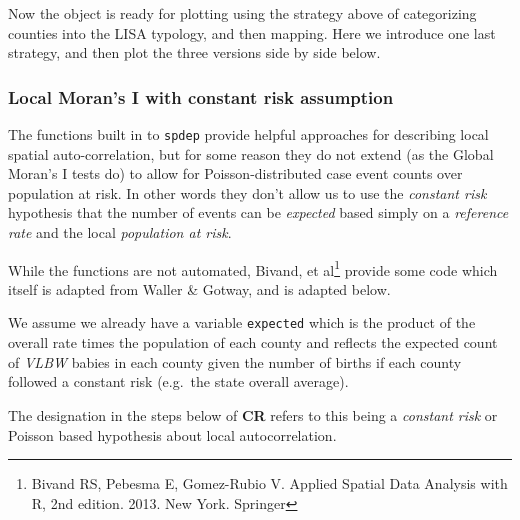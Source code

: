 \documentclass[
]{book}
\newenvironment{Shaded}{\begin{snugshade}}{\end{snugshade}}
\newcommand{\CommentTok}[1]{\textcolor[rgb]{0.56,0.35,0.01}{\textit{#1}}}
\newcommand{\DecValTok}[1]{\textcolor[rgb]{0.00,0.00,0.81}{#1}}
\newcommand{\FunctionTok}[1]{\textcolor[rgb]{0.00,0.00,0.00}{#1}}
\newcommand{\NormalTok}[1]{#1}
\newcommand{\OtherTok}[1]{\textcolor[rgb]{0.56,0.35,0.01}{#1}}
\newcommand{\SpecialCharTok}[1]{\textcolor[rgb]{0.00,0.00,0.00}{#1}}
\begin{document}
\begin{Shaded}
\end{Shaded}

Now the object is ready for plotting using the strategy above of categorizing counties into the LISA typology, and then mapping. Here we introduce one last strategy, and then plot the three versions side by side below.

\hypertarget{local-morans-i-with-constant-risk-assumption}{%
\subsubsection{Local Moran's I with constant risk assumption}\label{local-morans-i-with-constant-risk-assumption}}

The functions built in to \texttt{spdep} provide helpful approaches for describing local spatial auto-correlation, but for some reason they do not extend (as the Global Moran's I tests do) to allow for Poisson-distributed case event counts over population at risk. In other words they don't allow us to use the \emph{constant risk} hypothesis that the number of events can be \emph{expected} based simply on a \emph{reference rate} and the local \emph{population at risk}.

While the functions are not automated, Bivand, et al\footnote{Bivand RS, Pebesma E, Gomez-Rubio V. Applied Spatial Data Analysis with R, 2nd edition. 2013. New York. Springer} provide some code which itself is adapted from Waller \& Gotway, and is adapted below.

We assume we already have a variable \texttt{expected} which is the product of the overall rate times the population of each county and reflects the expected count of \emph{VLBW} babies in each county given the number of births if each county followed a constant risk (e.g.~the state overall average).

The designation in the steps below of \textbf{CR} refers to this being a \emph{constant risk} or Poisson based hypothesis about local autocorrelation.
\end{document}
